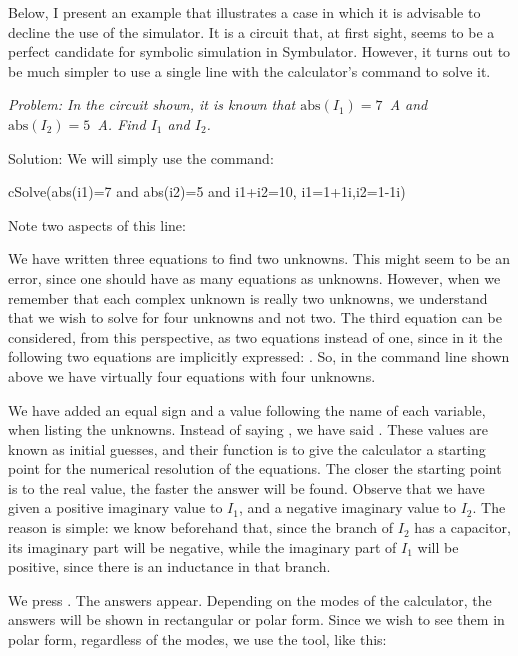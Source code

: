 Below, I present an example that illustrates a case in which it is
advisable to decline the use of the simulator. It is a circuit that,
at first sight, seems to be a perfect candidate for symbolic
simulation in Symbulator. However, it turns out to be much simpler
to use a single line with the calculator's  command to
solve it.


\emph{Problem: In the circuit shown, it is known that
$\mathrm{abs}(I_1) = 7$~A and $\mathrm{abs}(I_2) = 5$~A. Find $I_1$
and $I_2$.}

Solution: We will simply use the  command:

\begin{entry}
cSolve(abs(i1)=7 and abs(i2)=5 and i1+i2=10,
       {i1=1+1i,i2=1-1i})
\end{entry}

Note two aspects of this line:

We have written three equations to find two unknowns. This might
seem to be an error, since one should have as many equations as
unknowns. However, when we remember that each complex unknown is
really two unknowns, we understand that we wish to solve for four
unknowns and not two. The third equation can be considered, from
this perspective, as two equations instead of one, since in it the
following two equations are implicitly expressed:
. So, in the
command line shown above we have virtually four equations with four
unknowns.

We have added an equal sign and a value following the name of each
variable, when listing the unknowns. Instead of saying
, we have said . These
values are known as initial guesses, and their function is to give
the calculator a starting point for the numerical resolution of the
equations. The closer the starting point is to the real value, the
faster the answer will be found. Observe that we have given a
positive imaginary value to $I_1$, and a negative imaginary value to
$I_2$. The reason is simple: we know beforehand that, since the
branch of $I_2$ has a capacitor, its imaginary part will be
negative, while the imaginary part of $I_1$ will be positive, since
there is an inductance in that branch.

We press . The answers appear. Depending on the modes of
the calculator, the answers will be shown in rectangular or polar
form. Since we wish to see them in polar form, regardless of the
modes, we use the  tool, like this:

